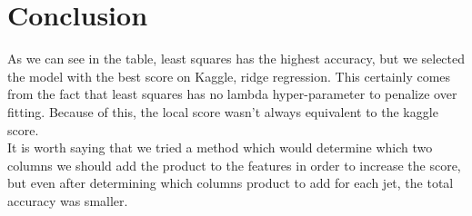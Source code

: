\documentclass[a4paper]{article}
\begin{document}
\section{Conclusion}
As we can see in the table, least squares has the highest accuracy, but we selected the model with the best score on Kaggle, ridge regression. This certainly comes from the fact that least squares has no lambda hyper-parameter to penalize over fitting. Because of this, the local score wasn't always equivalent to the kaggle score.\\

It is worth saying that we tried a method which would determine which two columns we should add the product to the features in order to increase the score, but even after determining which columns product to add for each jet, the total accuracy was smaller.
\end{document}
